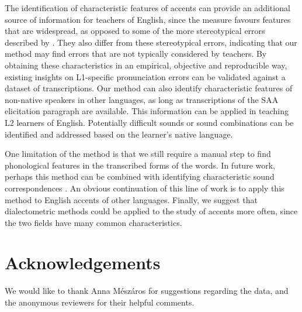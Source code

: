 \documentclass[output=paper]{LSP/langsci}
\begin{document}
The identification of characteristic features of accents can provide an additional source of information for teachers of English, since the measure favours features that are widespread, as opposed to some of the more stereotypical errors described by \citet{van_den_doel_evaluation_2006}. They also differ from these stereotypical errors, indicating that our method may find errors that are not typically considered by teachers. By obtaining these characteristics in an empirical, objective and reproducible way, existing insights on L1-specific pronunciation errors can be validated against a dataset of transcriptions. Our method can also identify characteristic features of non-native speakers in other languages, as long as transcriptions of the SAA elicitation paragraph are available. This information can be applied in teaching L2 learners of English. Potentially difficult sounds or sound combinations can be identified and addressed based on the learner's native language.

One limitation of the method is that we still require a manual step to find phonological features in the transcribed forms of the words. In future work, perhaps this method can be combined with identifying characteristic sound correspondences \citep{wieling_bipartite_2011}. An obvious continuation of this line of work is to apply this method to English accents of other languages. Finally, we suggest that dialectometric methods could be applied to the study of accents more often, since the two fields have many common characteristics.

\section*{Acknowledgements}

We would like to thank Anna M\'{e}sz\'{a}ros for suggestions regarding the  data, and the anonymous reviewers for their helpful comments.


\printbibliography[heading=subbibliography,notkeyword=this]
\end{document}
